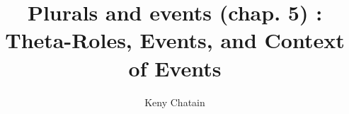


\endofdump


\newcommand{\scale}1

\title{Plurals and events (chap. 5) : Theta-Roles, Events, and Context of Events}
\author{Keny Chatain}


\maketitle



